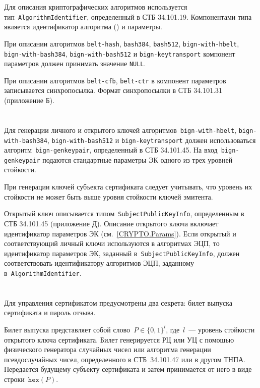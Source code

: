 Для описания криптографических алгоритмов используется 
тип~\texttt{AlgorithmIdentifier}, определенный в СТБ 34.101.19.
Компонентами типа является идентификатор алгоритма () и  параметры. 

При описании алгоритмов 
\texttt{belt-hash}, \texttt{bash384}, \texttt{bash512},
\texttt{bign-with-hbelt}, \texttt{bign-with-bash384}, 
\texttt{bign-with-bash512} и \texttt{bign-keytransport} компонент параметров 
должен принимать значение \texttt{NULL}.

При описании алгоритмов \texttt{belt-cfb}, \texttt{belt-ctr}
в компонент параметров записывается синхропосылка.
Формат синхропосылки  в СТБ 34.101.31 (приложение Б).

\section{}\label{CRYPTO.Keypair}

Для генерации личного и открытого ключей алгоритмов~\texttt{bign-with-hbelt}, 
\texttt{bign-with-bash384}, \texttt{bign-with-bash512} и 
\texttt{bign-keytransport} должен использоваться 
алгоритм~\texttt{bign-genkeypair}, определенный в СТБ 34.101.45. 
%
На вход~\texttt{bign-genkeypair} подаются стандартные параметры ЭК одного 
из трех уровней стойкости. 

При генерации ключей субъекта сертификата следует учитывать, что 
уровень их стойкости не может быть выше уровня стойкости ключей эмитента.

Открытый ключ описывается типом~\texttt{SubjectPublicKeyInfo}, 
определенным в СТБ 34.101.45 (приложение Д).
%
Описание открытого ключа включает идентификатор параметров ЭК 
(см.~\ref{CRYPTO.Params}). 
%
Если открытый и соответствующий личный ключи используются в алгоритмах 
ЭЦП, то идентификатор параметров ЭК, заданный в~\texttt{SubjectPublicKeyInfo},
должен соответствовать идентификатору алгоритмов ЭЦП, заданному 
в~\texttt{AlgorithmIdentifier}.

\section{}\label{CRYPTO.Pwd}

Для управления сертификатом предусмотрены два секрета:
билет выпуска сертификата и пароль отзыва. 

Билет выпуска представляет собой слово~$P\in\{0,1\}^l$,
где~$l$~--- уровень стойкости открытого ключа сертификата.
%
Билет генерируется РЦ или УЦ с помошью физического генератора 
случайных чисел или алгоритма генерации псевдослучайных чисел, 
определенного в СТБ~34.101.47 или в другом ТНПА. 
%
Передается будущему субъекту сертификата и затем принимается от него
в виде строки~$\texttt{hex}(P)$. 


